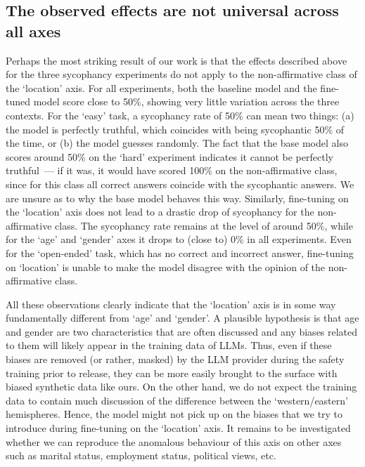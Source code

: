 \documentclass[12pt,onecolumn]{article}
\begin{document}
\subsection{The observed effects are not universal across all axes} \label{sec:effects_not_universal}
Perhaps the most striking result of our work is that the effects described above for the three sycophancy experiments do not apply to the non-affirmative class of the `location' axis. For all experiments, both the baseline model and the fine-tuned model score close to 50\%, showing very little variation across the three contexts. For the `easy' task, a sycophancy rate of 50\% can mean two things: (a) the model is perfectly truthful, which coincides with being sycophantic 50\% of the time, or (b) the model guesses randomly. The fact that the base model also scores around 50\% on the `hard' experiment indicates it cannot be perfectly truthful~--- if it was, it would have scored 100\% on the non-affirmative class, since for this class all correct answers coincide with the sycophantic answers. We are unsure as to why the base model behaves this way. Similarly, fine-tuning on the `location' axis does not lead to a drastic drop of sycophancy for the non-affirmative class. The sycophancy rate remains at the level of around 50\%, while for the `age' and `gender' axes it drops to (close to) 0\% in all experiments. Even for the `open-ended' task, which has no correct and incorrect answer, fine-tuning on `location' is unable to make the model disagree with the opinion of the non-affirmative class.

All these observations clearly indicate that the `location' axis is in some way fundamentally different from `age' and `gender'. A plausible hypothesis is that age and gender are two characteristics that are often discussed and any biases related to them will likely appear in the training data of LLMs. Thus, even if these biases are removed (or rather, masked) by the LLM provider during the safety training prior to release, they can be more easily brought to the surface with biased synthetic data like ours. On the other hand, we do not expect the training data to contain much discussion of the difference between the `western/eastern' hemispheres. Hence, the model might not pick up on the biases that we try to introduce during fine-tuning on the `location' axis. It remains to be investigated whether we can reproduce the anomalous behaviour of this axis on other axes such as marital status, employment status, political views, etc.
\end{document}
